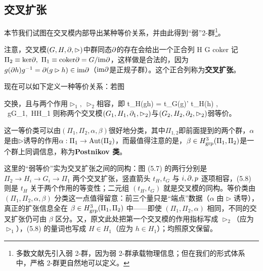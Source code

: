 
\subsection{交叉扩张}\label{sec:cross-extension}

本节我们试图在交叉模内部导出某种等价关系，并由此得到“弱”2-群\footnote{多数文献先引入弱 2-群，因为弱 2-群承载物理信息；但在我们的形式体系中，严格 2-群更自然地可以定义。}。

注意，交叉模$(G,H,\partial , \rhd)$中群同态$\partial$的存在会给出一个正合列
\ptl {} H \stack{\ptl}{\longrightarrow} G   {\rm coker}\ptl {} \ee
记$\Pi_2 \equiv {\rm ker}\partial, \  \Pi_1\equiv {\rm coker}\partial = G/ {\rm im}\partial  $，这样做是合法的，因为$g(\partial h)g^{-1} = \partial(g\rhd h)\in {\rm im}\partial$（${\rm im}\partial$是正规子群）。这个正合列称为\textbf{交叉扩张}。

现在可以如下定义一种等价关系：若图
\be
\label{2-group-equiv}
\ee
交换，且与两个作用$\rhd_1, \ \rhd_2 $相容，即
\be t_H(g\rhd h) = t_G(g)\rhd' t_H(h) , \ \forall g\in G_1,\ H\in H_1  \ee
则称两个交叉模$(G_1,H_1,\partial_1 , \rhd_2)$与$(G_2,H_2,\partial_2 , \rhd_2)$弱等价。

这一等价类可以由$(\Pi_1,\Pi_2,\alpha,\beta)$很好地分类，其中$\Pi_{1,2}$即前面提到的两个群，$\alpha$是由$\rhd$诱导的作用$\alpha : \Pi_1\to {\rm Aut}(\Pi_2)$，而最值得注意的是，$\beta\in H^3_{\rm grp}(\Pi_1,\Pi_2)$是一个群上同调信息，称为\textbf{Postnikov 类}。

\begin{yizhu}这里的“弱等价”实为交叉扩张之间的同构：图 (5.7) 的两行分别是 $\Pi_2\to H_i\to G_i\to\Pi_1$ 两个交叉扩张，竖直箭头 $t_H,t_G$ 与 $i,\partial,p$ 逐项相容，(5.8) 则是 $t_H$ 关于两个作用的等变性；二元组 $(t_H,t_G)$ 就是交叉模的同构。等价类由 $(\Pi_1,\Pi_2,\alpha,\beta)$ 分类这一点值得留意：前三个量只是“端点”数据（$\alpha$ 由 $\rhd$ 诱导），真正的扩张信息全在 $\beta\in H^3_{\rm grp}(\Pi_1,\Pi_2)$ 中——即使 $(\Pi_1,\Pi_2,\alpha)$ 相同，不同的交叉扩张仍可由 $\beta$ 区分。又，原文此处把第一个交叉模的作用指标写成 $\rhd_2$（应为 $\rhd_1$），(5.8) 的量词也写成 $H\in H_1$（应为 $h\in H_1$）；均照原文保留。\end{yizhu}

